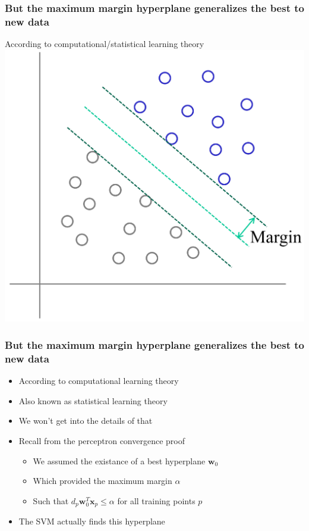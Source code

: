 \documentclass[12pt,notes,mathserif]{beamer}
\begin{document}
\begin{frame}[c]
\frametitle{But the maximum margin hyperplane generalizes the best to new data}
\begin{center}
According to computational/statistical learning theory\\
\includegraphics[width=0.6\linewidth]{fig8/lec86.jpg}
\end{center}
\end{frame}


\begin{frame}[c]
\frametitle{But the maximum margin hyperplane generalizes the best to new data}
\begin{itemize}
\item According to computational learning theory
\item Also known as statistical learning theory
\item We won't get into the details of that
\item Recall from the perceptron convergence proof
		\begin{itemize}
		\item We assumed the existance of a best hyperplane $\mathbf{w}_0$
		\item Which provided the maximum margin ${\alpha}$
		\item Such that $d_p\mathbf{w}_0^T\mathbf{x}_p\leqslant{}\alpha$ for all training points $p$
		\end{itemize}
\item The SVM actually finds this hyperplane
\end{itemize}

\end{frame}
\end{document}
